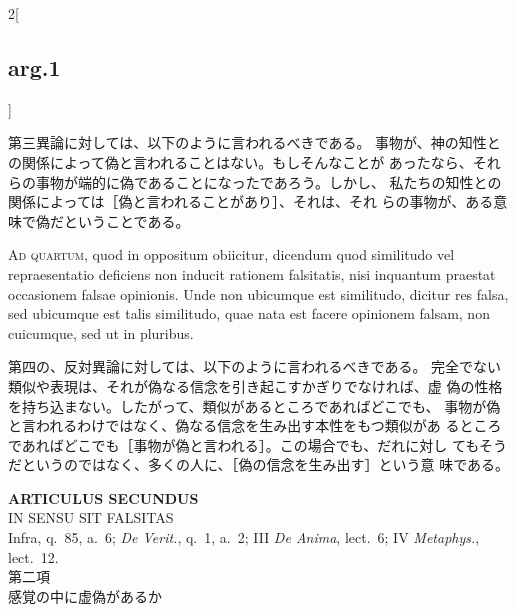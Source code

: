 \documentclass[paper=a4paper,fontsize=10pt,jafontsize=9pt,titlepage]{jlreq}
\begin{document}
\begin{paracol}{2}[\subsection{arg.1}]
\switchcolumn

第三異論に対しては、以下のように言われるべきである。
事物が、神の知性との関係によって偽と言われることはない。もしそんなことが
 あったなら、それらの事物が端的に偽であることになったであろう。しかし、
 私たちの知性との関係によっては［偽と言われることがあり］、それは、それ
 らの事物が、ある意味で偽だということである。

\switchcolumn*[\subsection{ad.4}]


{\scshape Ad quartum}, quod in oppositum obiicitur,
dicendum quod similitudo vel repraesentatio deficiens non inducit
rationem falsitatis, nisi inquantum praestat occasionem falsae
opinionis. Unde non ubicumque est similitudo, dicitur res falsa, sed
ubicumque est talis similitudo, quae nata est facere opinionem falsam,
non cuicumque, sed ut in pluribus.

\switchcolumn

第四の、反対異論に対しては、以下のように言われるべきである。
完全でない類似や表現は、それが偽なる信念を引き起こすかぎりでなければ、虚
 偽の性格を持ち込まない。したがって、類似があるところであればどこでも、
 事物が偽と言われるわけではなく、偽なる信念を生み出す本性をもつ類似があ
 るところであればどこでも［事物が偽と言われる］。この場合でも、だれに対し
 てもそうだというのではなく、多くの人に、［偽の信念を生み出す］という意
 味である。

\end{paracol}

\newpage

{}
\setcounter{section}{2}
\setcounter{subsection}{0}
\begin{center}
 {\Large {\bfseries ARTICULUS SECUNDUS}}\\
 {\large IN SENSU SIT FALSITAS}\\
 {\footnotesize Infra, q.~85, a.~6; {\itshape De Verit.}, q.~1, a.~2;
 III {\itshape De Anima}, lect.~6; IV {\itshape Metaphys.}, lect.~12.}\\
 {\Large 第二項\\感覚の中に虚偽があるか}
\end{center}
\end{document}
